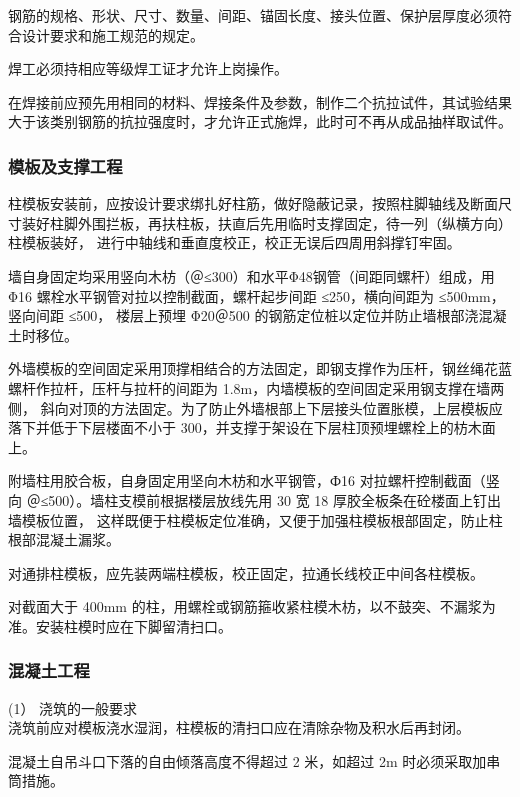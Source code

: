  钢筋的规格、形状、尺寸、数量、间距、锚固长度、接头位置、保护层厚度必须符合设计要求和施工规范的规定。

 焊工必须持相应等级焊工证才允许上岗操作。

 在焊接前应预先用相同的材料、焊接条件及参数，制作二个抗拉试件，其试验结果大于该类别钢筋的抗拉强度时，才允许正式施焊，此时可不再从成品抽样取试件。


\subsubsection{模板及支撑工程}

柱模板安装前，应按设计要求绑扎好柱筋，做好隐蔽记录，按照柱脚轴线及断面尺寸装好柱脚外围拦板，再扶柱板，扶直后先用临时支撑固定，待一列（纵横方向）柱模板装好，
进行中轴线和垂直度校正，校正无误后四周用斜撑钉牢固。

墙自身固定均采用竖向木枋（＠≤300）和水平Φ48钢管（间距同螺杆）组成，用 Φ16 螺栓水平钢管对拉以控制截面，螺杆起步间距 ≤250，横向间距为 ≤500mm，竖向间距 ≤500，
楼层上预埋 Φ20＠500 的钢筋定位桩以定位并防止墙根部浇混凝土时移位。

外墙模板的空间固定采用顶撑相结合的方法固定，即钢支撑作为压杆，钢丝绳花蓝螺杆作拉杆，压杆与拉杆的间距为 1.8m，内墙模板的空间固定采用钢支撑在墙两侧，
斜向对顶的方法固定。为了防止外墙根部上下层接头位置胀模，上层模板应落下并低于下层楼面不小于 300，并支撑于架设在下层柱顶预埋螺栓上的枋木面上。

附墙柱用胶合板，自身固定用坚向木枋和水平钢管，Ф16 对拉螺杆控制截面（竖向 ＠≤500）。墙柱支模前根据楼层放线先用 30 宽 18 厚胶全板条在砼楼面上钉出墙模板位置，
这样既便于柱模板定位准确，又便于加强柱模板根部固定，防止柱根部混凝土漏浆。

对通排柱模板，应先装两端柱模板，校正固定，拉通长线校正中间各柱模板。

对截面大于	400mm 的柱，用螺栓或钢筋箍收紧柱模木枋，以不鼓突、不漏浆为准。安装柱模时应在下脚留清扫口。


\subsubsection{混凝土工程}

(1） 浇筑的一般要求\\

 浇筑前应对模板浇水湿润，柱模板的清扫口应在清除杂物及积水后再封闭。

 混凝土自吊斗口下落的自由倾落高度不得超过 2 米，如超过 2m 时必须采取加串筒措施。

